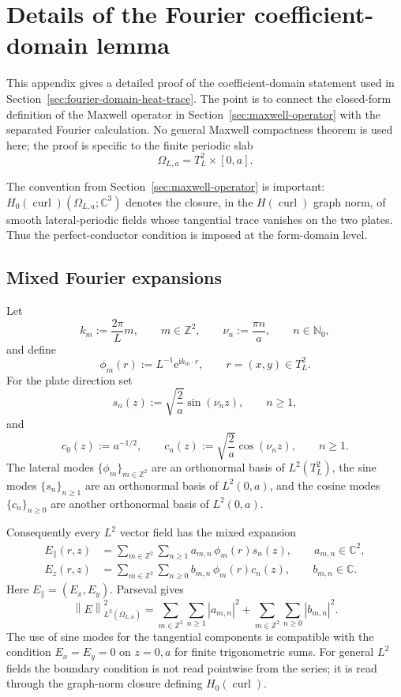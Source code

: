 \documentclass[11pt]{article}
\providecommand{\C}{\mathbb{C}}
\providecommand{\Z}{\mathbb{Z}}
\providecommand{\N}{\mathbb{N}}
\providecommand{\ii}{\mathrm{i}}
\providecommand{\ee}{\mathrm{e}}
\providecommand{\abs}[1]{\left\lvert #1\right\rvert}
\providecommand{\norm}[1]{\left\lVert #1\right\rVert}
\providecommand{\OmegaLa}{\Omega_{L,a}}
\providecommand{\TtwoL}{T_L^2}
\providecommand{\Hzcurl}{H_0(\operatorname{curl})}
\numberwithin{equation}{section}
\begin{document}
\section{Details of the Fourier coefficient-domain lemma}
\label{app:fourier-domain-lemma}

This appendix gives a detailed proof of the coefficient-domain statement used in
Section~\ref{sec:fourier-domain-heat-trace}.  The point is to connect the
closed-form definition of the Maxwell operator in Section~\ref{sec:maxwell-operator}
with the separated Fourier calculation.  No general Maxwell compactness theorem
is used here; the proof is specific to the finite periodic slab
\[
    \OmegaLa=\TtwoL\times[0,a].
\]

The convention from Section~\ref{sec:maxwell-operator} is important:
\(\Hzcurl(\OmegaLa;\C^3)\) denotes the closure, in the
\(H(\operatorname{curl})\) graph norm, of smooth lateral-periodic fields whose
tangential trace vanishes on the two plates.  Thus the perfect-conductor
condition is imposed at the form-domain level.

\subsection{Mixed Fourier expansions}
\label{app:subsec:mixed-expansions}

Let
\[
    k_m:=\frac{2\pi}{L}m,
    \qquad m\in\Z^2,
    \qquad
    \nu_n:=\frac{\pi n}{a},
    \qquad n\in\N_0,
\]
and define
\[
    \phi_m(r):=L^{-1}\ee^{\ii k_m\cdot r},
    \qquad r=(x,y)\in\TtwoL .
\]
For the plate direction set
\[
    s_n(z):=\sqrt{\frac2a}\sin(\nu_n z),\qquad n\ge1,
\]
and
\[
    c_0(z):=a^{-1/2},
    \qquad
    c_n(z):=\sqrt{\frac2a}\cos(\nu_n z),\qquad n\ge1.
\]
The lateral modes \(\{\phi_m\}_{m\in\Z^2}\) are an orthonormal basis of
\(L^2(\TtwoL)\), the sine modes \(\{s_n\}_{n\ge1}\) are an orthonormal basis of
\(L^2(0,a)\), and the cosine modes \(\{c_n\}_{n\ge0}\) are another orthonormal
basis of \(L^2(0,a)\).

Consequently every \(L^2\) vector field has the mixed expansion
\begin{align}
    E_{\parallel}(r,z)
    &=
    \sum_{m\in\Z^2}\sum_{n\ge1}
    a_{m,n}\,\phi_m(r)s_n(z),
    \qquad a_{m,n}\in\C^2,                                  \label{eq:app-mixed-tangential}\\
    E_z(r,z)
    &=
    \sum_{m\in\Z^2}\sum_{n\ge0}
    b_{m,n}\,\phi_m(r)c_n(z),
    \qquad b_{m,n}\in\C .                                     \label{eq:app-mixed-normal}
\end{align}
Here \(E_{\parallel}=(E_x,E_y)\).  Parseval gives
\begin{equation}
\label{eq:app-parseval-L2}
    \norm{E}_{L^2(\OmegaLa)}^2
    =
    \sum_{m\in\Z^2}\sum_{n\ge1}\abs{a_{m,n}}^2
    +
    \sum_{m\in\Z^2}\sum_{n\ge0}\abs{b_{m,n}}^2 .
\end{equation}
The use of sine modes for the tangential components is compatible with the
condition \(E_x=E_y=0\) on \(z=0,a\) for finite trigonometric sums.  For general
\(L^2\) fields the boundary condition is not read pointwise from the series; it
is read through the graph-norm closure defining \(\Hzcurl\).
\end{document}
